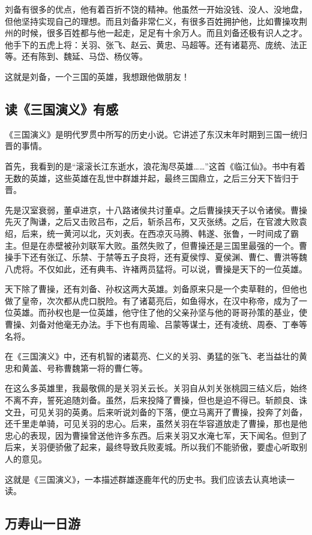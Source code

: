 \documentclass[UTF8,a4paper,titlepage,twoside,10.5pt]{article}
\begin{document}
刘备有很多的优点，他有着百折不饶的精神。他虽然一开始没钱、没人、没地盘，但他坚持实现自己的理想。而且刘备非常仁义，有很多百姓拥护他，比如曹操攻荆州的时候，很多百姓都与他一起走，足足有十余万人。而且刘备还极有识人之才。他手下的五虎上将：关羽、张飞、赵云、黄忠、马超等。还有诸葛亮、庞统、法正等。还有陈到、魏延、马岱、杨仪等。

这就是刘备，一个三国的英雄，我想跟他做朋友！

\subsection{读《三国演义》有感}
\label{sec:orga17a642}

《三国演义》是明代罗贯中所写的历史小说。它讲述了东汉末年时期到三国一统归晋的事情。

首先，我看到的是“滚滚长江东逝水，浪花淘尽英雄……”这首《临江仙》。书中有着无数的英雄，这些英雄在乱世中群雄并起，最终三国鼎立，之后三分天下皆归于晋。

先是汉室衰弱，董卓进京，十八路诸侯共讨董卓。之后曹操挟天子以令诸侯。曹操先灭了陶谦，之后又击败吕布，之后，斩杀吕布，又灭张绣。之后，在官渡大败袁绍，后来，统一黄河以北，灭刘表。在西凉灭马腾、韩遂、张鲁，一时间成了霸主。但是在赤壁被孙刘联军大败。虽然失败了，但曹操还是三国里最强的一个。曹操手下还有张辽、乐禁、于禁等五子良将，还有夏侯惇、夏侯渊、曹仁、曹洪等魏八虎将。不仅如此，还有典韦、许褚两员猛将。可以说，曹操是天下的一位英雄。

天下除了曹操，还有刘备、孙权这两大英雄。刘备原来只是一个卖草鞋的，但他也做了皇帝，次次都从虎口脱险。有了诸葛亮后，如鱼得水，在汉中称帝，成为了一位英雄。而孙权也是一位英雄，他守住了他的父亲孙坚与他的哥哥孙策的基业，使曹操、刘备对他毫无办法。手下也有周瑜、吕蒙等谋士，还有凌统、周泰、丁奉等名将。

在《三国演义》中，还有机智的诸葛亮、仁义的关羽、勇猛的张飞、老当益壮的黄忠和黄盖、号称曹魏第一将的曹仁等。

在这么多英雄里，我最敬佩的是关羽关云长。关羽自从刘关张桃园三结义后，始终不离不弃，誓死追随刘备。虽然，后来投降了曹操，但也是迫不得已。斩颜良、诛文丑，可见关羽的英勇。后来听说刘备的下落，便立马离开了曹操，投奔了刘备，还千里走单骑，可见关羽的忠心。后来，虽然关羽在华容道放走了曹操，那也是他忠心的表现，因为曹操曾送他许多东西。后来关羽又水淹七军，天下闻名。但到了后来，关羽便骄傲了起来，最终导致兵败麦城。所以我们不能骄傲，要虚心听取别人的意见。

这就是《三国演义》，一本描述群雄逐鹿年代的历史书。我们应该去认真地读一读。

\subsection{万寿山一日游}
\label{sec:org011b7dc}
\end{document}

